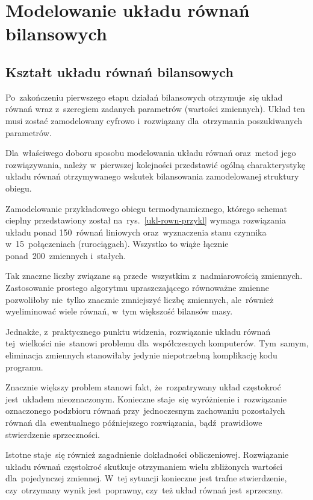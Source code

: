\section{Modelowanie układu równań bilansowych}

\subsection{Kształt układu równań bilansowych}

Po~zakończeniu pierwszego etapu działań bilansowych otrzymuje~się układ
równań wraz z~szeregiem zadanych parametrów (wartości zmiennych). Układ
ten musi zostać zamodelowany cyfrowo i~rozwiązany dla~otrzymania
poszukiwanych parametrów.

Dla~właściwego doboru sposobu modelowania układu równań oraz~metod jego
rozwiązywania, należy w~pierwszej kolejności przedstawić ogólną
charakterystykę układu równań otrzymywanego wskutek bilansowania
zamodelowanej struktury obiegu.



Zamodelowanie przykładowego obiegu termodynamicznego, którego schemat
cieplny przedstawiony został na~rys.~\ref{ukl-rown-przykl} wymaga
rozwiązania układu ponad 150~równań liniowych oraz~wyznaczenia stanu
czynnika w~15~połączeniach (rurociągach). Wszystko to wiąże łącznie
ponad~200~zmiennych i~stałych.

Tak znaczne liczby związane są przede~wszystkim z~nadmiarowością
zmiennych. Zastosowanie prostego algorytmu upraszczającego równoważne
zmienne pozwoliłoby nie~tylko znacznie zmniejszyć liczbę zmiennych,
ale~również wyeliminować wiele równań, w~tym większość bilansów masy.

Jednakże, z~praktycznego punktu widzenia, rozwiązanie układu równań
tej~wielkości nie~stanowi problemu dla~współczesnych komputerów.
Tym~samym, eliminacja zmiennych stanowiłaby jedynie niepotrzebną
komplikację kodu programu.

Znacznie większy problem stanowi fakt, że~rozpatrywany układ częstokroć
jest~układem nieoznaczonym. Konieczne staje~się wyróżnienie
i~rozwiązanie oznaczonego podzbioru równań przy~jednoczesnym zachowaniu
pozostałych równań dla~ewentualnego późniejszego rozwiązania,
bądź~prawidłowe stwierdzenie sprzeczności.

Istotne staje~się również zagadnienie dokładności obliczeniowej.
Rozwiązanie układu równań częstokroć skutkuje otrzymaniem wielu
zbliżonych wartości dla~pojedynczej zmiennej. W~tej sytuacji konieczne
jest trafne stwierdzenie, czy~otrzymany wynik jest~poprawny, czy~też
układ równań jest~sprzeczny.



